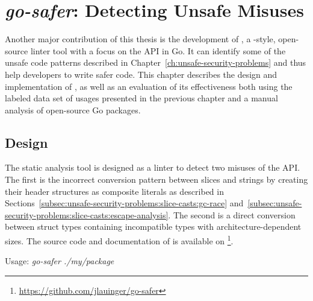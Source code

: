 
\chapter{\textit{go-safer}: Detecting Unsafe Misuses}\label{ch:go-safer}

Another major contribution of this thesis is the development of \toolSafer{}, a \toolVet{}-style, open-source linter
tool with a focus on the \unsafe{} \acrshort{API} in Go.
It can identify some of the unsafe code patterns described in Chapter~\ref{ch:unsafe-security-problems} and thus help
developers to write safer code.
This chapter describes the design and implementation of \toolSafer{}, as well as an evaluation of its effectiveness both
using the labeled data set of \unsafe{} usages presented in the previous chapter and a manual analysis of 
open-source Go packages.





\section{Design}\label{sec:go-safer:design}

The \toolSafer{} static analysis tool is designed as a linter to detect two misuses of the \unsafe{} \acrshort{API}.
The first is the incorrect conversion pattern between slices and strings by creating their header structures as
composite literals as described in Sections~\ref{subsec:unsafe-security-problems:slice-casts:gc-race}
and~\ref{subsec:unsafe-security-problems:slice-casts:escape-analysis}.
The second is a direct conversion between struct types containing incompatible types with architecture-dependent sizes.
The source code and documentation of \toolSafer{} is available on
\github{}\footnote{\url{https://github.com/jlauinger/go-safer}}.





Usage: \textit{go-safer ./my/package}




